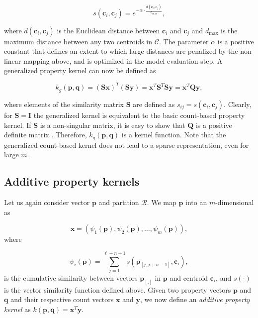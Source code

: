 \[
s(\mathbf{c}_{i},\mathbf{c}_{j})=e^{-\alpha\cdot\frac{d(\mathbf{c}_{i},\mathbf{c}_{j})}{d_{\max}}},
\]

\noindent where $d(\mathbf{c}_{i},\mathbf{c}_{j})$ is the Euclidean distance between $\mathbf{c}_{i}$ and $\mathbf{c}_{j}$ and $d_{\max}$ is the maximum distance between any two centroids in $\mathcal{C}$. The parameter $\alpha$ is a positive constant that defines an extent to which large distances are penalized by the non-linear mapping above, and is optimized in the model evaluation step. A generalized property kernel can now be defined as

\[
k_{g}(\mathbf{p},\mathbf{q})=(\mathbf{Sx})^{T}(\mathbf{Sy})=\mathbf{x}^{T}\mathbf{S}^{T}\mathbf{S}\mathbf{y}=\mathbf{x}^{T}\mathbf{Q}\mathbf{y},
\]

\noindent where elements of the similarity matrix $\mathbf{S}$ are defined as $s_{ij}=s(\mathbf{c}_{i},\mathbf{c}_{j})$. Clearly, for $\mathbf{S}=\mathbf{I}$ the generalized kernel is equivalent to the basic count-based property kernel. If \textbf{$\mathbf{S}$} is a non-singular matrix, it is easy to show that $\mathbf{Q}$ is a positive definite matrix \citep{strang2003introduction}. Therefore, $k_{g}(\mathbf{p},\mathbf{q})$ is a kernel function. Note that the generalized count-based kernel does not lead to a sparse representation, even for large $m$. 


\subsection{Additive property kernels}
\label{sec:additivekernels}

Let us again consider vector $\mathbf{p}$ and partition $\mathcal{R}$. We map $\mathbf{p}$ into an $m$-dimensional as 

\[
\mathbf{x}=\left(\psi_{1}(\mathbf{p}),\psi_{2}(\mathbf{p}),\ldots,\psi_{m}(\mathbf{p})\right),
\]
where 

\[
\psi_{i}(\mathbf{p})=\sum_{j=1}^{\ell-n+1}s\left(\mathbf{p}_{\left[j,j+n-1\right]},\mathbf{c}_{i}\right),
\]
is the cumulative similarity between vectors $\mathbf{p}_{[.]}$ in $\mathbf{p}$ and centroid $\mathbf{c}_{i}$, and $s\left(\cdot\right)$ is the vector similarity function defined above. Given two property vectors $\mathbf{p}$ and $\mathbf{q}$ and their respective count vectors $\mathbf{x}$ and $\mathbf{y}$, we now define an \textit{additive property kernel} as $k(\mathbf{p},\mathbf{q})=\mathbf{x}^{T}\mathbf{y}$. 


